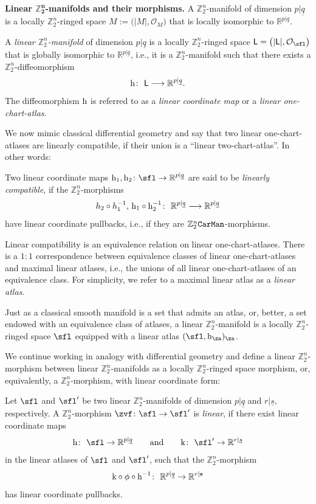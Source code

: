 \documentclass[pdftex]{sigma}%
\newcommand{\rmh}{\textnormal{h}}
\newcommand{\rmk}{\textnormal{k}}
\newcommand{\R}{{\mathbb R}}
\newcommand{\Z}{{\mathbb Z}}
\def\ul{\underline}
\def\cO{\mathcal{O}}
\def\ul{\underline}
\newcommand{\0}{\otimes}
\newcommand{\z}{\Z_2^n}
\numberwithin{equation}{section}
\begin{document}
\medskip\noindent
{\bf Linear $\boldsymbol{\z}$-manifolds and their morphisms.} A $\Z_2^n$-manifold of dimension $p|\ul q$ is a locally $\Z^n_2$-ringed space $M := \big(|M|, \cO_M\big)$ that is locally isomorphic to $\R^{p|\ul q}$.
%
\begin{Definition}%
A {\it linear $\Z_2^n$-manifold} of dimension $p|\ul q$ is a locally $\Z_2^n$-ringed space $\textsf{L}=\big(|\textsf{L}|,\cO_\sfl\big)$ that is globally isomorphic to $\R^{p|\ul{q}}$, i.e., it is a $\Z_2^n$-manifold such that there exists a $\Z_2^n$-diffeomorphism
%
\[
\rmh \colon\ \textsf{L} \longrightarrow \R^{p|\ul{q}}.
\]
%
The diffeomorphism $\rmh$ is referred to as a \emph{linear coordinate map} or a \emph{linear one-chart-atlas}.
\end{Definition}
%

We now mimic classical differential geometry and say that two linear one-chart-atlases are linearly compatible, if their union is a ``linear two-chart-atlas''. In other words:

\begin{Definition}
Two linear coordinate maps $\rmh_1, \rmh_2 \colon \sfl \rightarrow \R^{p|\ul{q}}$ are said to be \emph{linearly compa\-tible}, if the $\z$-morphisms
%
\[
h_2\circ h_1^{-1},\,\rmh_1 \circ \rmh^{-1}_2 \colon\ \R^{p|\ul{q}} \longrightarrow \R^{p|\ul{q}}
\]
%
have linear coordinate pullbacks, i.e., if they are $\z\tt CarMan$-morphisms.
\end{Definition}

Linear compatibility is an equivalence relation on linear one-chart-atlases. There is a \mbox{$1:1$} correspondence between equivalence classes of linear one-chart-atlases and maximal linear atla\-ses, i.e., the unions of all linear one-chart-atlases of an equivalence class. For simplicity, we refer to a maximal linear atlas as a \emph{linear atlas}.

Just as a classical smooth manifold is a set that admits an atlas, or, better, a set endowed with an equivalence class of atlases, a linear $\Z_2^n$-manifold is a locally $\z$-ringed space $\sfl$ equipped with a linear atlas $(\sfl,\rmh_\za)_\za$.

We continue working in analogy with differential geometry and define a linear $\Z_2^n$-morphism between linear $\z$-manifolds as a locally $\Z_2^n$-ringed space morphism, or, equivalently, a $\z$-morphism, with linear coordinate form:
\begin{Definition}\label{def:LinMorpTen}
Let $\sfl$ and $\sfl'$ be two linear $\z$-manifolds of dimension $p|\ul q$ and $r|\ul s$, respectively. A $\Z_2^n$-morphism $\zvf\colon \sfl\to \sfl'$ is {\it linear}, if there exist linear coordinate maps
\[
\rmh\colon\ \sfl\to\R^{p|\ul q}\qquad\text{and}\qquad\rmk\colon\ \sfl'\to\R^{r|\ul s}
\]
in the linear atlases of $\sfl$ and $\sfl'$, such that the $\z$-morphism
\[
\rmk \circ \phi \circ \rmh^{-1}\colon\ \mathbb{R}^{p|\ul{q}} \rightarrow \mathbb{R}^{r|\mathbf{s}}
\]
has linear coordinate pullbacks.
\end{Definition}
\end{document}
